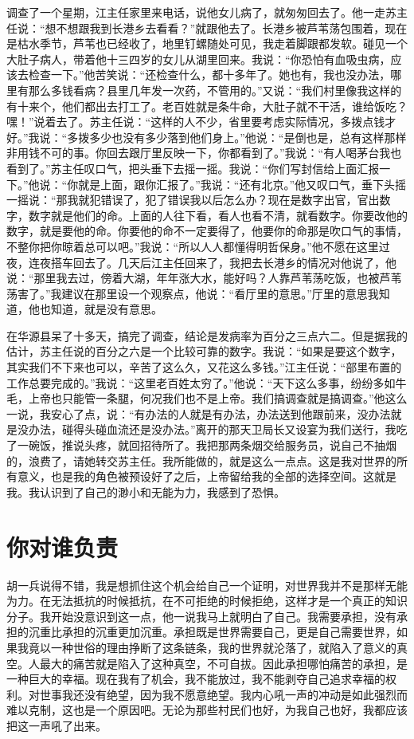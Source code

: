 \documentclass[12pt,oneside]{book}
\begin{document}
调查了一个星期，江主任家里来电话，说他女儿病了，就匆匆回去了。他一走苏主任说：``想不想跟我到长港乡去看看？''就跟他去了。长港乡被芦苇荡包围着，现在是枯水季节，芦苇也已经收了，地里钉螺随处可见，我走着脚跟都发软。碰见一个大肚子病人，带着他十三四岁的女儿从湖里回来。我说：``你恐怕有血吸虫病，应该去检查一下。''他苦笑说：``还检查什么，都十多年了。她也有，我也没办法，哪里有那么多钱看病？县里几年发一次药，不管用的。''又说：``我们村里像我这样的有十来个，他们都出去打工了。老百姓就是条牛命，大肚子就不干活，谁给饭吃？嘿！''说着去了。苏主任说：``这样的人不少，省里要考虑实际情况，多拨点钱才好。''我说：``多拨多少也没有多少落到他们身上。''他说：``是倒也是，总有这样那样非用钱不可的事。你回去跟厅里反映一下，你都看到了。''我说：``有人喝茅台我也看到了。''苏主任叹口气，把头垂下去摇一摇。我说：``你们写封信给上面汇报一下。''他说：``你就是上面，跟你汇报了。''我说：``还有北京。''他又叹口气，垂下头摇一摇说：``那我就犯错误了，犯了错误我以后怎么办？现在是数字出官，官出数字，数字就是他们的命。上面的人往下看，看人也看不清，就看数字。你要改他的数字，就是要他的命。你要他的命不一定要得了，他要你的命那是吹口气的事情，不整你把你晾着总可以吧。''我说：``所以人人都懂得明哲保身。''他不愿在这里过夜，连夜搭车回去了。几天后江主任回来了，我把去长港乡的情况对他说了，他说：``那里我去过，傍着大湖，年年涨大水，能好吗？人靠芦苇荡吃饭，也被芦苇荡害了。''我建议在那里设一个观察点，他说：``看厅里的意思。''厅里的意思我知道，他也知道，就是没有意思。

在华源县呆了十多天，搞完了调查，结论是发病率为百分之三点六二。但是据我的估计，苏主任说的百分之六是一个比较可靠的数字。我说：``如果是要这个数字，其实我们不下来也可以，辛苦了这么久，又花这么多钱。''江主任说：``部里布置的工作总要完成的。''我说：``这里老百姓太穷了。''他说：``天下这么多事，纷纷多如牛毛，上帝也只能管一条腿，何况我们也不是上帝。我们搞调查就是搞调查。''他这么一说，我安心了点，说：``有办法的人就是有办法，办法送到他跟前来，没办法就是没办法，碰得头碰血流还是没办法。''离开的那天卫局长又设宴为我们送行，我吃了一碗饭，推说头疼，就回招待所了。我把那两条烟交给服务员，说自己不抽烟的，浪费了，请她转交苏主任。我所能做的，就是这么一点点。这是我对世界的所有意义，也是我的角色被预设好了之后，上帝留给我的全部的选择空间。这就是我。我认识到了自己的渺小和无能为力，我感到了恐惧。


\chapter{你对谁负责}
胡一兵说得不错，我是想抓住这个机会给自己一个证明，对世界我并不是那样无能为力。在无法抵抗的时候抵抗，在不可拒绝的时候拒绝，这样才是一个真正的知识分子。我开始没意识到这一点，他一说我马上就明白了自己。我需要承担，没有承担的沉重比承担的沉重更加沉重。承担既是世界需要自己，更是自己需要世界，如果我竟以一种世俗的理由挣断了这条链条，我的世界就沦落了，就陷入了意义的真空。人最大的痛苦就是陷入了这种真空，不可自拔。因此承担哪怕痛苦的承担，是一种巨大的幸福。现在我有了机会，我不能放过，我不能剥夺自己追求幸福的权利。对世事我还没有绝望，因为我不愿意绝望。我内心吼一声的冲动是如此强烈而难以克制，这也是一个原因吧。无论为那些村民们也好，为我自己也好，我都应该把这一声吼了出来。
\end{document}
